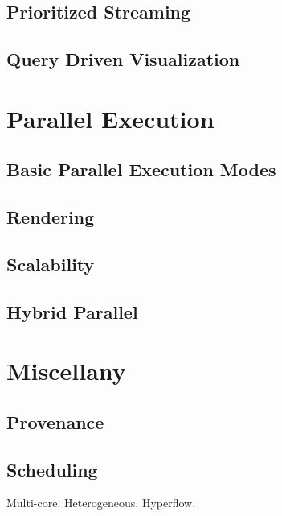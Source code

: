 \documentclass{article}
\begin{document}
\subsection{Prioritized Streaming}
\label{sec:PrioritizedStreaming}

\subsection{Query Driven Visualization}
\label{sec:QueryDrivenVisualization}


\section{Parallel Execution}
\label{sec:ParallelExecution}

\subsection{Basic Parallel Execution Modes}
\label{sec:ParallelExecution:Modes}

\subsection{Rendering}
\label{sec:ParallelExecution:Rendering}

\subsection{Scalability}
\label{sec:Scalability}

\subsection{Hybrid Parallel}
\label{sec:HybridParallel}


\section{Miscellany}
\label{sec:Misc}

\subsection{Provenance}
\label{sec:Provenance}

\subsection{Scheduling}
\label{sec:Scheduling}

Multi-core.  Heterogeneous.  Hyperflow.
\end{document}
